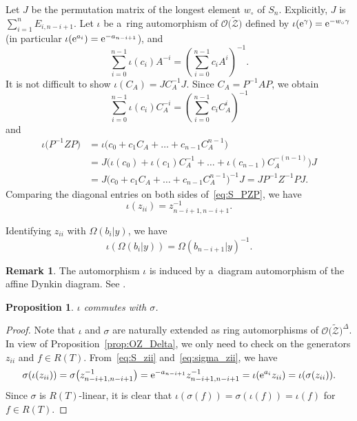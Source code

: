 \documentclass[10pt,a4paper]{amsart}
\numberwithin{equation}{section}
\newtheorem{Proposition}[Theorem]{Proposition}
\theoremstyle{definition}
\newtheorem{Remark}[Theorem]{Remark}
\begin{document}
Let $J$ be the permutation matrix
of the longest element $w_\circ$ of $S_n$.
Explicitly, $J$ is $\sum_{i=1}^n E_{i,n-i+1}$.
Let $\iota$ be a~ring automorphism of $\mathscr{O}\bigl(\tilde{\mathscr{Z}}\bigr)$ defined by
$\iota({\rm e}^\gamma)=
{\rm e}^{-w_\circ \gamma}$ (in particular
$\iota({\rm e}^{a_i})={\rm e}^{-a_{n-i+1}}$), and
\[%
\sum_{i=0}^{n-1}
\iota(c_i)A^{-i}
=\left(\sum_{i=0}^{n-1}
c_iA^{i}\right)^{-1}.
\]
It is not difficult to show $\iota(C_A)=JC_A^{-1}J$.
Since $C_A=P^{-1}AP$, we obtain
\[\sum_{i=0}^{n-1}
\iota(c_i)C_A^{-i}
=\left(\sum_{i=0}^{n-1}
c_iC_A^{i}\right)^{-1}
\] and
\begin{align}
\iota\bigl(P^{-1}ZP\bigr)
&=\iota\bigl(c_0+c_1C_A+\dots+c_{n-1}C_A^{n-1}\bigr) \nonumber\\
&=J\bigl(\iota(c_0)+\iota(c_1)C_A^{-1}+\dots+\iota(c_{n-1})C_A^{-(n-1)} \bigr)J\nonumber\\
&=J\bigl(c_0+c_1C_A+\dots+c_{n-1}C_A^{n-1} \bigr)^{-1}J=JP^{-1}Z^{-1}PJ.\label{eq:S_PZP}
\end{align}
Comparing the diagonal entries on both sides of~\eqref{eq:S_PZP}, we have
\begin{equation}
\label{eq:S_zii}
\iota(z_{ii})=z_{n-i+1,n-i+1}^{-1}.
\end{equation}

Identifying $z_{ii}$ with $\Omega(b_i|y)$, we have
\begin{equation}\label{eq:iota Omega}
\iota(\Omega(b_i|y))=\Omega(b_{n-i+1}|y)^{-1}.
\end{equation}


\begin{Remark}
The automorphism $\iota$ is induced by a~diagram automorphism of the affine Dynkin diagram. See \cite[Sections~2.7 and~3.3]{ISY}.
\end{Remark}

\begin{Proposition}\label{prop:S_and_sigma}
$\iota$ commutes with $\sigma$.
\end{Proposition}
\begin{proof}
Note that $\iota$ and $\sigma$ are naturally extended
as ring automorphisms
of $\mathscr{O}\bigl(\tilde{\mathscr{Z}}\bigr)^\Delta$. In view of
Proposition~\ref{prop:OZ_Delta}, we only need to check on the generators $z_{ii}$
and $f\in R(T)$.
From~\eqref{eq:S_zii} and~\eqref{eq:sigma_zii}, we have
\begin{align*}
 \sigma (\iota(z_{ii}))
 =\sigma\bigl(z_{n-i+1,n-i+1}^{-1}\bigr)=
 {\rm e}^{-a_{n-i+1}}
 z_{n-i+1,n-i+1}^{-1}=\iota({\rm e}^{a_i}z_{ii})=\iota(\sigma(z_{ii})).
\end{align*}
Since $\sigma$ is $R(T)$-linear, it is clear that
$\iota(\sigma(f))=\sigma(\iota(f))=\iota(f)
$ for $f\in R(T)$.
\end{proof}
\end{document}
